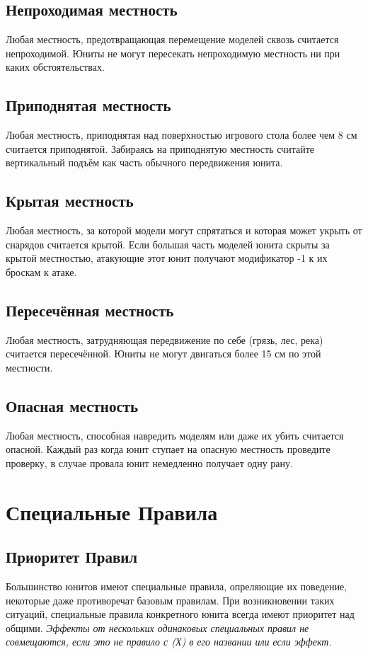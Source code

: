 \documentclass[twocolumn]{article}
\begin{document}
\subsection{Непроходимая местность}
Любая местность, предотвращающая перемещение моделей сквозь считается непроходимой. Юниты не могут пересекать непроходимую местность ни при каких обстоятельствах.

\subsection{Приподнятая местность}
Любая местность, приподнятая над поверхностью игрового стола более чем 8 см считается приподнятой. Забираясь на приподнятую местность считайте вертикальный подъём как часть обычного передвижения юнита.

\subsection{Крытая местность}
Любая местность, за которой модели могут спрятаться и которая может укрыть от снарядов считается крытой. Если большая часть моделей юнита скрыты за крытой местностью, атакующие этот юнит получают модификатор -1 к их броскам к атаке.

\subsection{Пересечённая местность}
Любая местность, затрудняющая передвижение по себе (грязь, лес, река) считается пересечённой. Юниты не могут двигаться более 15 см по этой местности.

\subsection{Опасная местность}
Любая местность, способная навредить моделям или даже их убить считается опасной. Каждый раз когда юнит ступает на опасную местность проведите проверку, в случае провала юнит немедленно получает одну рану.

\newpage

\section{Специальные Правила}
\subsection{Приоритет Правил}
Большинство юнитов имеют специальные правила, опреляющие их поведение, некоторые даже противоречат базовым правилам. При возникновении таких ситуаций, специальные правила конкретного юнита всегда имеют приоритет над общими. \emph{Эффекты от нескольких одинаковых специальных правил не совмещаются, если это не правило с (Х) в его названии или если эффект.}
\end{document}
